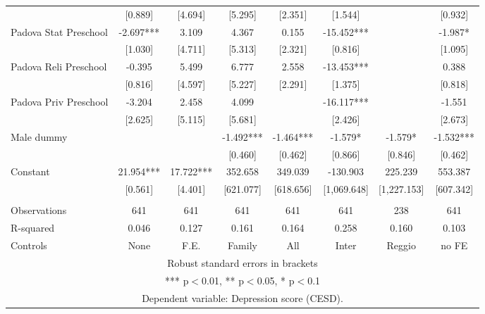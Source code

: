 \begin{tabular}{lccccccc}
 & [0.889] & [4.694] & [5.295] & [2.351] & [1.544] &  & [0.932] \\
Padova Stat Preschool & -2.697*** & 3.109 & 4.367 & 0.155 & -15.452*** &  & -1.987* \\
 & [1.030] & [4.711] & [5.313] & [2.321] & [0.816] &  & [1.095] \\
Padova Reli Preschool & -0.395 & 5.499 & 6.777 & 2.558 & -13.453*** &  & 0.388 \\
 & [0.816] & [4.597] & [5.227] & [2.291] & [1.375] &  & [0.818] \\
Padova Priv Preschool & -3.204 & 2.458 & 4.099 &  & -16.117*** &  & -1.551 \\
 & [2.625] & [5.115] & [5.681] &  & [2.426] &  & [2.673] \\
Male dummy &  &  & -1.492*** & -1.464*** & -1.579* & -1.579* & -1.532*** \\
 &  &  & [0.460] & [0.462] & [0.866] & [0.846] & [0.462] \\
Constant & 21.954*** & 17.722*** & 352.658 & 349.039 & -130.903 & 225.239 & 553.387 \\
 & [0.561] & [4.401] & [621.077] & [618.656] & [1,069.648] & [1,227.153] & [607.342] \\
 &  &  &  &  &  &  &  \\
Observations & 641 & 641 & 641 & 641 & 641 & 238 & 641 \\
R-squared & 0.046 & 0.127 & 0.161 & 0.164 & 0.258 & 0.160 & 0.103 \\
 Controls & None & F.E. & Family & All & Inter & Reggio & no FE \\ \hline
\multicolumn{8}{c}{ Robust standard errors in brackets} \\
\multicolumn{8}{c}{ *** p$<$0.01, ** p$<$0.05, * p$<$0.1} \\
\multicolumn{8}{c}{ Dependent variable: Depression score (CESD).} \\
\end{tabular}
